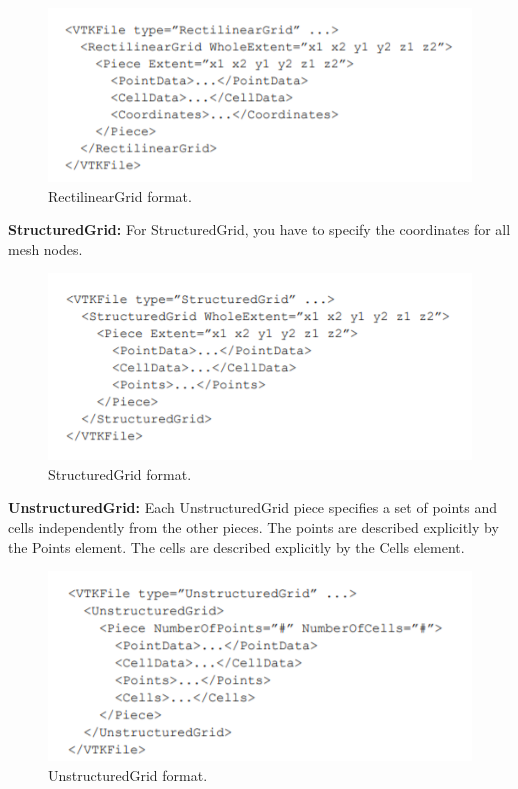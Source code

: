 \documentclass[onecolumn, draftclsnofoot,10pt, compsoc]{IEEEtran}
\begin{document}
\begin{figure}[H]
\centering
\includegraphics{RectilinearGrid.png}
\caption{RectilinearGrid format.}
\label{fig:rectilineargrid}
\end{figure}

\noindent
\textbf{StructuredGrid:} For StructuredGrid, you have to specify the coordinates for all mesh nodes.

\begin{figure}[H]
\centering
\includegraphics{StructuredGrid.png}
\caption{StructuredGrid format.}
\label{fig:structuredgrid}
\end{figure}

\noindent
\textbf{UnstructuredGrid:} Each UnstructuredGrid piece specifies a set of points and cells independently from the other pieces. The points are described explicitly by the Points element. The cells are described explicitly by the Cells element.

\begin{figure}[H]
\centering
\includegraphics{UnstructuredGrid.png}
\caption{UnstructuredGrid format.}
\label{fig:unstructuredgrid}
\end{figure}
\end{document}
